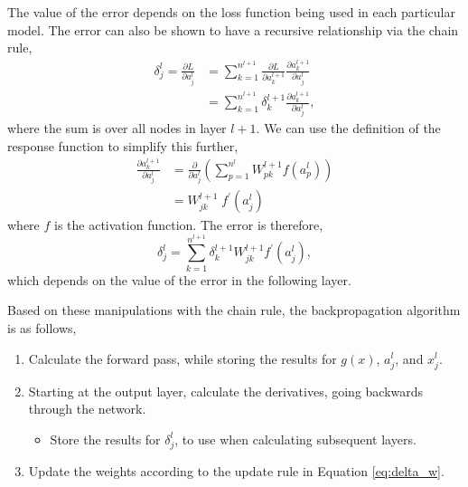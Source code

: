 The value of the error depends on the loss function being used in each 
particular model. The error can also be shown to have a recursive relationship 
via the chain rule,
\begin{align*}
		\delta^l_j = \frac{\partial L}{\partial a^l_j} &= \sum_{k=1}^{n^{l+1}} 
		\frac{\partial L}{\partial a^{l+1}_{k}}\frac{\partial a^{l+1}_k}{\partial 
		a^l_j}\\ 
		&= \sum^{n^{l+1}}_{k = 1} \delta^{l+1}_k \frac{\partial a^{l+1}_k}{\partial 
		a^l_j},
\end{align*}
where the sum is over all nodes in layer $l+1$. We can use the definition of the
response function to simplify this further,
\begin{align*}
		\frac{\partial a^{l+1}_k}{\partial a^l_j} &= \frac{\partial}{\partial a^l_j} 
		\left( \sum^{n^l}_{p=1} W^{l+1}_{pk} f(a^l_p) \right) \\ 
		&= W^{l+1}_{jk} \; f^\prime(a^l_j)
\end{align*}
where $f$ is the activation function. The error is therefore,
\begin{equation*}
	\delta^l_j = \sum^{n^{l+1}}_{k=1} \delta^{l+1}_k W^{l+1}_{jk} f^\prime(a^l_j),
\end{equation*}
which depends on the value of the error in the following layer.

Based on these manipulations with the chain rule, the backpropagation 
algorithm is as follows,
\begin{enumerate}
	\item Calculate the forward pass, while storing the results for $g(x)$, 
		$a^l_j$, and $x^l_j$.
	\item Starting at the output layer, calculate the derivatives, going backwards
		through the network. 
	\begin{itemize}
		\item Store the results for $\delta^l_j$, to use when calculating subsequent
			layers.
	\end{itemize}
	\item Update the weights according to the update rule in Equation 
		\ref{eq:delta_w}.
\end{enumerate}


